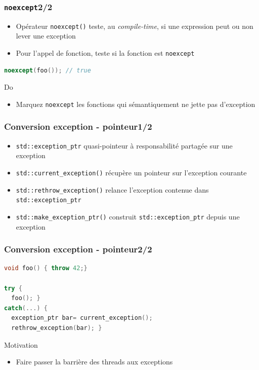 \documentclass[C++.tex]{subfiles}
\begin{document}
\begin{frame}[fragile]
	\frametitle{\lstinline|noexcept|\titlehfill{}2/2}
	\begin{itemize}
		\item Opérateur \lstinline|noexcept()| teste, au \textit{compile-time}, si une expression peut ou non lever une exception
		\item Pour l'appel de fonction, teste si la fonction est \lstinline|noexcept|

	\end{itemize}

	\begin{lstlisting}[language=C++]
noexcept(foo()); // true\end{lstlisting}

	\begin{exampleblock}{Do}
		\begin{itemize}
			\item Marquez \lstinline|noexcept| les fonctions qui sémantiquement ne jette pas d'exception
		\end{itemize}
	\end{exampleblock}
\end{frame}

\begin{frame}[fragile]
	\frametitle{Conversion exception - pointeur\titlehfill{}1/2}
	\begin{itemize}
		\item \lstinline|std::exception_ptr| quasi-pointeur à responsabilité partagée sur une exception
		\item \lstinline|std::current_exception()| récupère un pointeur sur l'exception courante
		\item \lstinline|std::rethrow_exception()| relance l'exception contenue dans \lstinline|std::exception_ptr| 
		\item \lstinline|std::make_exception_ptr()| construit \lstinline|std::exception_ptr| depuis une exception
	\end{itemize}
\end{frame}

\begin{frame}[fragile]
	\frametitle{Conversion exception - pointeur\titlehfill{}2/2}
	\begin{lstlisting}[language=C++]
void foo() { throw 42;}

try {
  foo(); }
catch(...) {
  exception_ptr bar= current_exception();
  rethrow_exception(bar); } \end{lstlisting}

	\begin{block}{Motivation}
		\begin{itemize}
			\item Faire passer la barrière des threads aux exceptions
		\end{itemize}
	\end{block}
\end{frame}
\end{document}
